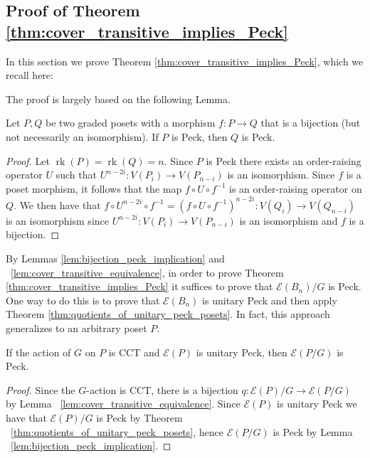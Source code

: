 \documentclass[smallextended, envcountsame, numbook]{svjour3}
\numberwithin{equation}{section}
\newcommand\ssec{\subsection}
\newcommand\rk{\operatorname{rk}}
\begin{document}
\ssec{Proof of Theorem \ref{thm:cover_transitive_implies_Peck}}\label{ssec:proof_of_cover_transitive_implies_Peck}

In this section we prove Theorem \ref{thm:cover_transitive_implies_Peck}, which we recall here:

\cctpeck*

The proof is largely based on the following Lemma.

\begin{lemma}\label{lem:bijection_peck_implication}
Let $P,Q$ be two graded posets with a morphism $f\colon P\rightarrow Q$ that is a bijection (but not necessarily an isomorphism). If $P$ is Peck, then $Q$ is Peck.
\end{lemma}
\begin{proof}
Let $\rk(P) = \rk(Q) = n$.  Since $P$ is Peck there exists an order-raising operator $U$ such that $U^{n-2i}\colon V(P_i)\rightarrow V(P_{n-i})$ is an isomorphism.  Since $f$ is a poset morphism, it follows that the map $f\circ U\circ f^{-1}$ is an order-raising operator on $Q$.  We then have that $f\circ U^{n-2i}\circ f^{-1} = \left(f\circ U\circ f^{-1}\right)^{n-2i}\colon V(Q_i)\rightarrow V(Q_{n-i})$ is an isomorphism since $U^{n-2i}\colon V(P_i)\rightarrow V(P_{n-i})$ is an isomorphism and $f$ is a bijection.

\end{proof}

By Lemmas \ref{lem:bijection_peck_implication} and ~\ref{lem:cover_transitive_equivalence}, in order to prove Theorem \ref{thm:cover_transitive_implies_Peck} it suffices to prove that $\mathcal E(B_n)/G$ is Peck.  One way to do this is to prove that $\mathcal E(B_n)$ is unitary Peck and then apply Theorem \ref{thm:quotients_of_unitary_peck_posets}.  In fact, this approach generalizes to an arbitrary poset $P$.
\label{thm:cover_transitive_implies_Peck}

\begin{theorem}
\label{edge_unitary_peck_quotient}
If the action of $G$ on $P$ is CCT and $\mathcal E(P)$ is unitary Peck, then $\mathcal E(P/G)$ is Peck.
\end{theorem}
\begin{proof}
Since the $G$-action is CCT, there is a bijection $q\colon\mathcal{E}(P)/G \rightarrow \mathcal{E}(P/G)$ by Lemma ~\ref{lem:cover_transitive_equivalence}.  Since $\mathcal{E}(P)$ is unitary Peck we have that $\mathcal{E}(P)/G$ is Peck by Theorem ~\ref{thm:quotients_of_unitary_peck_posets}, hence $\mathcal{E}(P/G)$ is Peck by Lemma ~\ref{lem:bijection_peck_implication}.
\end{proof}
\end{document}

